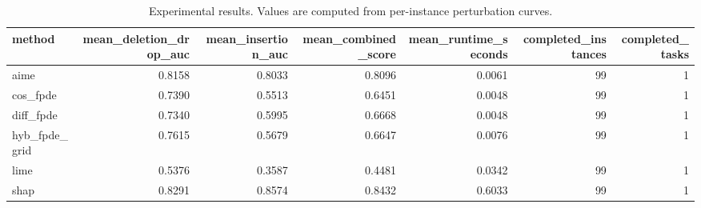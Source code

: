 \begin{table}[t]
\caption{Experimental results. Values are computed from per-instance perturbation curves.}
\label{tab:main_results_computed}
\centering
\begin{tabular}{lrrrrrr}
\toprule
method & mean\_deletion\_drop\_auc & mean\_insertion\_auc & mean\_combined\_score & mean\_runtime\_seconds & completed\_instances & completed\_tasks \\
\midrule
aime & 0.8158 & 0.8033 & 0.8096 & 0.0061 & 99 & 1 \\
cos\_fpde & 0.7390 & 0.5513 & 0.6451 & 0.0048 & 99 & 1 \\
diff\_fpde & 0.7340 & 0.5995 & 0.6668 & 0.0048 & 99 & 1 \\
hyb\_fpde\_grid & 0.7615 & 0.5679 & 0.6647 & 0.0076 & 99 & 1 \\
lime & 0.5376 & 0.3587 & 0.4481 & 0.0342 & 99 & 1 \\
shap & 0.8291 & 0.8574 & 0.8432 & 0.6033 & 99 & 1 \\
\bottomrule
\end{tabular}

\end{table}
